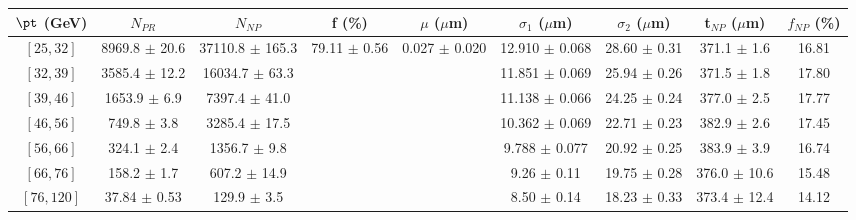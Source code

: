\begin{tabular}{c||c|c|c|c|c|c|c||c}
$\pt$ (GeV) & $N_{PR}$ & $N_{NP}$ & f (\%) & $\mu$ ($\mu$m) & $\sigma_1$ ($\mu$m) & $\sigma_2$ ($\mu$m)  & t$_{NP}$ ($\mu$m) & $f_{NP}$ (\%) \\
\hline
$[25, 32]$ & 8969.8 $\pm$ 20.6 & 37110.8 $\pm$ 165.3 & \multirow{7}{*}{79.11 $\pm$ 0.56} & \multirow{7}{*}{0.027 $\pm$ 0.020} & 12.910 $\pm$ 0.068 & 28.60 $\pm$ 0.31 & 371.1 $\pm$ 1.6 & 16.81\\
$[32, 39]$ & 3585.4 $\pm$ 12.2 & 16034.7 $\pm$ 63.3 &  &  & 11.851 $\pm$ 0.069 & 25.94 $\pm$ 0.26 & 371.5 $\pm$ 1.8 & 17.80\\
$[39, 46]$ & 1653.9 $\pm$ 6.9 & 7397.4 $\pm$ 41.0 &  &  & 11.138 $\pm$ 0.066 & 24.25 $\pm$ 0.24 & 377.0 $\pm$ 2.5 & 17.77\\
$[46, 56]$ & 749.8 $\pm$ 3.8 & 3285.4 $\pm$ 17.5 &  &  & 10.362 $\pm$ 0.069 & 22.71 $\pm$ 0.23 & 382.9 $\pm$ 2.6 & 17.45\\
$[56, 66]$ & 324.1 $\pm$ 2.4 & 1356.7 $\pm$ 9.8 &  &  & 9.788 $\pm$ 0.077 & 20.92 $\pm$ 0.25 & 383.9 $\pm$ 3.9 & 16.74\\
$[66, 76]$ & 158.2 $\pm$ 1.7 & 607.2 $\pm$ 14.9 &  &  & 9.26 $\pm$ 0.11 & 19.75 $\pm$ 0.28 & 376.0 $\pm$ 10.6 & 15.48\\
$[76, 120]$ & 37.84 $\pm$ 0.53 & 129.9 $\pm$ 3.5 &  &  & 8.50 $\pm$ 0.14 & 18.23 $\pm$ 0.33 & 373.4 $\pm$ 12.4 & 14.12\\
\end{tabular}
